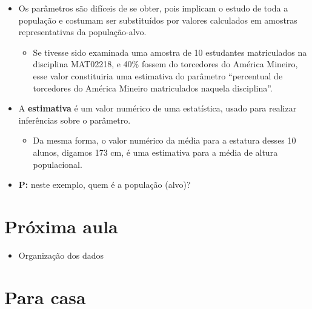 \documentclass[]{tufte-book}
\providecommand{\tightlist}{%
  \setlength{\itemsep}{0pt}\setlength{\parskip}{0pt}}
\begin{document}
\begin{itemize}
\tightlist
\item
  Os parâmetros são difíceis de se obter, pois implicam o estudo de toda
  a população e costumam ser substituídos por valores calculados em
  amostras representativas da população-alvo.

  \begin{itemize}
  \tightlist
  \item
    Se tivesse sido examinada uma amostra de 10 estudantes matriculados
    na disciplina MAT02218, e 40\% fossem do torcedores do América
    Mineiro, esse valor constituiria uma estimativa do parâmetro
    ``percentual de torcedores do América Mineiro matriculados naquela
    disciplina''.
  \end{itemize}
\item
  A \textbf{estimativa} é um valor numérico de uma estatística, usado
  para realizar inferências sobre o parâmetro.

  \begin{itemize}
  \tightlist
  \item
    Da mesma forma, o valor numérico da média para a estatura desses 10
    alunos, digamos 173 cm, é uma estimativa para a média de altura
    populacional.
  \end{itemize}
\item
  \textbf{P:} neste exemplo, quem é a população (alvo)?
\end{itemize}

\hypertarget{pruxf3xima-aula}{%
\section{Próxima aula}\label{pruxf3xima-aula}}

\begin{itemize}
\tightlist
\item
  Organização dos dados 
\end{itemize}

\hypertarget{para-casa}{%
\section{Para casa}\label{para-casa}}
\end{document}
